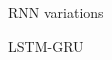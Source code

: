 


\begin{frame}
  \begin{center}
    {\Large RNN variations}
    
    LSTM-GRU
  \end{center}
\end{frame}

